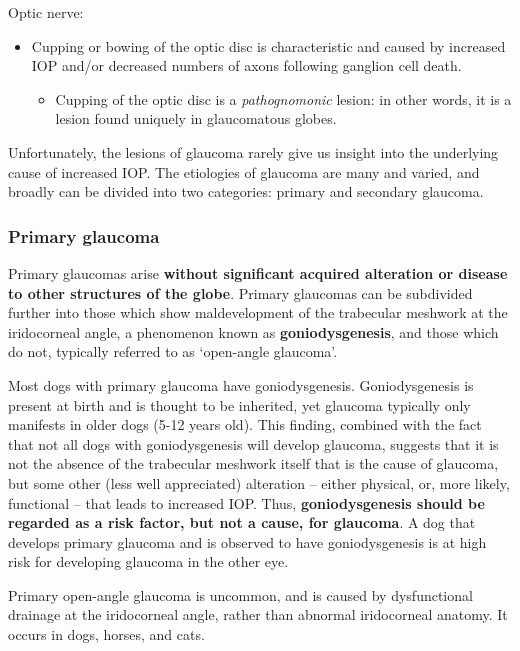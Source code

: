 \documentclass[openany]{article}
\providecommand{\tightlist}{%
  \setlength{\itemsep}{0pt}\setlength{\parskip}{0pt}}
\begin{document}
Optic nerve:

\begin{itemize}
\tightlist
\item
  Cupping or bowing of the optic disc is characteristic and caused by
  increased IOP and/or decreased numbers of axons following ganglion
  cell death.

  \begin{itemize}
  \tightlist
  \item
    Cupping of the optic disc is a \emph{pathognomonic} lesion: in other
    words, it is a lesion found uniquely in glaucomatous globes.
  \end{itemize}
\end{itemize}

Unfortunately, the lesions of glaucoma rarely give us insight into the
underlying cause of increased IOP. The etiologies of glaucoma are many
and varied, and broadly can be divided into two categories: primary and
secondary glaucoma.

\subsubsection{Primary glaucoma}\label{primary-glaucoma}

Primary glaucomas arise \textbf{without significant acquired alteration
or disease to other structures of the globe}. Primary glaucomas can be
subdivided further into those which show maldevelopment of the
trabecular meshwork at the iridocorneal angle, a phenomenon known as
\textbf{goniodysgenesis}, and those which do not, typically referred to
as `open-angle glaucoma'.

Most dogs with primary glaucoma have goniodysgenesis. Goniodysgenesis is
present at birth and is thought to be inherited, yet glaucoma typically
only manifests in older dogs (5-12 years old). This finding, combined
with the fact that not all dogs with goniodysgenesis will develop
glaucoma, suggests that it is not the absence of the trabecular meshwork
itself that is the cause of glaucoma, but some other (less well
appreciated) alteration -- either physical, or, more likely, functional
-- that leads to increased IOP. Thus, \textbf{goniodysgenesis should be
regarded as a risk factor, but not a cause, for glaucoma}. A dog that
develops primary glaucoma and is observed to have goniodysgenesis is at
high risk for developing glaucoma in the other eye.

Primary open-angle glaucoma is uncommon, and is caused by dysfunctional
drainage at the iridocorneal angle, rather than abnormal iridocorneal
anatomy. It occurs in dogs, horses, and cats.
\end{document}
